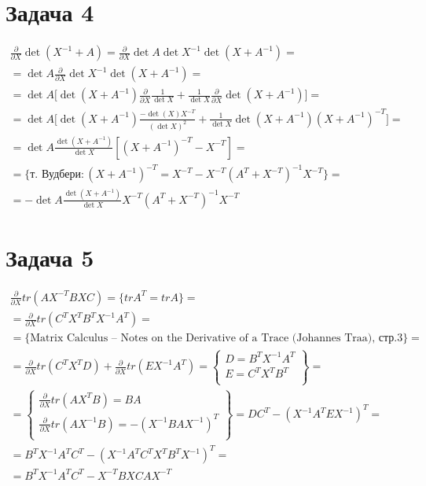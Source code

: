 \documentclass[12pt, a4paper]{article}
\begin{document}
    \section*{Задача 4}
    \begin{gather*}
        \frac{\partial}{\partial X}\det(X^{-1} + A) = \frac{\partial}{\partial X}\det{A} \det{X^{-1}} \det{(X+A^{-1})} = \\
        = \det{A} \frac{\partial}{\partial X} \det{X^{-1}} \det{(X+A^{-1})} = \\
        = \det{A} \Big[\det{(X+A^{-1})}\frac{\partial}{\partial X} \frac{1}{\det{X}} + \frac{1}{\det{X}}\frac{\partial}{\partial X}\det{(X+A^{-1})}\Big] = \\
        = \det{A} \Big[\det{(X+A^{-1})}\frac{-\det{(X)}X^{-T}}{(\det{X})^2} + \frac{1}{\det{X}}\det{(X+A^{-1})}(X+A^{-1})^{-T}\Big] =\\
        = \det{A} \frac{\det{(X+A^{-1})}}{\det{X}} [(X+A^{-1})^{-T} - X^{-T}] =\\ = \{\text{т. Вудбери}: (X+A^{-1})^{-T} = X^{-T} - X^{-T}(A^T + X^{-T})^{-1}X^{-T}\} =\\
        = -\det{A} \frac{\det{(X+A^{-1})}}{\det{X}}X^{-T}(A^T + X^{-T})^{-1}X^{-T}
    \end{gather*}

    \section*{Задача 5}
    \begin{gather*}
        \frac{\partial}{\partial X} tr(AX^{-T}BXC) = \{trA^T = trA\} = \\
        = \frac{\partial}{\partial X} tr(C^TX^TB^TX^{-1}A^T) = \\
        = \{\text{Matrix Calculus -- Notes on the Derivative of a Trace (Johannes Traa), стр.3}\} = \\
        = \frac{\partial}{\partial X} tr(C^TX^TD) + \frac{\partial}{\partial X} tr(EX^{-1}A^T) =
        \left\{
            \begin{array}{l}
                D = B^TX^{-1}A^T\\
                E = C^TX^TB^T\\
            \end{array}
        \right\} = \\
        = \left\{
            \begin{array}{l}
                \frac{\partial}{\partial X}tr(AX^TB) = BA\\
                \frac{\partial}{\partial X}tr(AX^{-1}B) = -(X^{-1}BAX^{-1})^T\\
            \end{array}
        \right\} = DC^T - (X^{-1}A^TEX^{-1})^T = \\
        = B^TX^{-1}A^TC^T - (X^{-1}A^TC^TX^TB^TX^{-1})^T = \\
        = B^TX^{-1}A^TC^T - X^{-T}BXCAX^{-T}
    \end{gather*}
\end{document}
